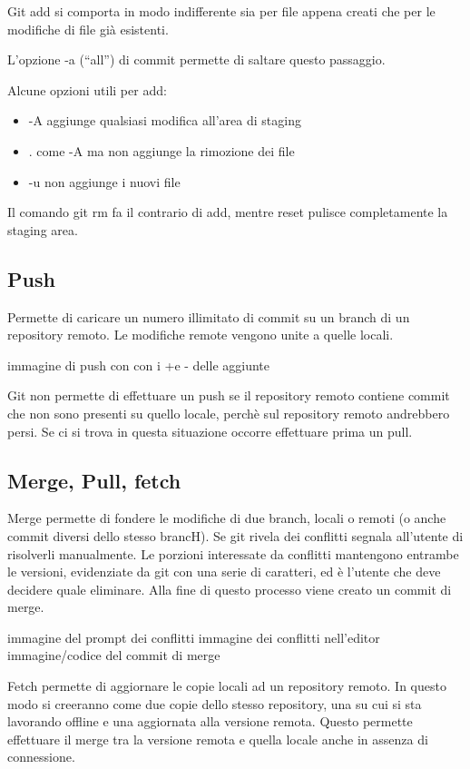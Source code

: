 \documentclass{article}
\begin{document}
Git add si comporta in modo indifferente sia per file appena creati che per le
modifiche di file già esistenti.

L'opzione -a (``all'') di commit permette di saltare questo passaggio.

Alcune opzioni utili per add:

\begin{itemize} \item -A aggiunge qualsiasi modifica all'area di staging \item .
come -A ma non aggiunge la rimozione dei file \item -u non aggiunge i nuovi file
\end{itemize}

Il comando git rm fa il contrario di add, mentre reset pulisce completamente la
staging area.

\subsection{Push}

Permette di caricare un numero illimitato di commit su un branch di un
repository remoto. Le modifiche remote vengono unite a quelle locali.

immagine di push con con i  +e - delle aggiunte

Git non permette di effettuare un push se il repository remoto contiene commit
che non sono presenti su quello locale, perchè sul repository remoto andrebbero
persi.  Se ci si trova in questa situazione occorre effettuare prima un pull.

\subsection{Merge, Pull, fetch}

Merge permette di fondere le modifiche di due branch, locali o remoti (o anche
commit diversi dello stesso brancH). Se git rivela dei conflitti segnala
all'utente di risolverli manualmente. Le porzioni interessate da conflitti
mantengono entrambe le versioni, evidenziate da git con una serie di caratteri,
ed è l'utente che deve decidere quale eliminare. Alla fine di questo processo
viene creato un commit di merge.

immagine del prompt dei conflitti immagine dei conflitti nell'editor
immagine/codice del commit di merge

Fetch permette di aggiornare le copie locali ad un repository remoto. In questo
modo si creeranno come due copie dello stesso repository, una su cui si sta
lavorando offline e una aggiornata alla versione remota. Questo permette
effettuare il merge tra la versione remota e quella locale anche in assenza di
connessione.
\end{document}
